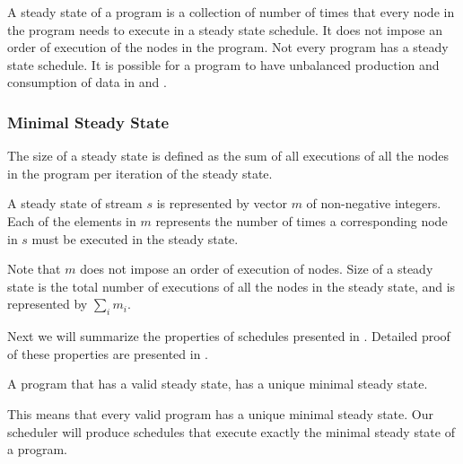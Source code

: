 A steady state of a program is a collection of number of times
that every node in the program needs to execute in a steady state
schedule.  It does not impose an order of execution of the nodes
in the program. Not every {\StreamIt} program has a steady state
schedule.  It is possible for a program to have unbalanced
production and consumption of data in {\splitjoins} and
{\feedbackloops}.
\begin{comment}
The amount of data buffered
continually increases, and cannot be reduced, thus making it
impossible to create a steady state schedule for them.  It is also
possible that a {\feedbackloop} does not have enough data buffered
up internally in order to complete execution of a full steady
state, and thus deadlocks. Programs without a valid steady state
schedule are not considered valid {\StreamIt} programs. In other
words, all valid {\StreamIt} programs have a steady state
schedule.
\end{comment}

\subsubsection{Minimal Steady State}

The size of a steady state is defined as the sum of all executions
of all the nodes in the program per iteration of the steady state.

\begin{definition}
A steady state of stream $s$ is represented by vector $m$ of
non-negative integers. Each of the elements in $m$ represents the
number of times a corresponding node in $s$ must be executed in
the steady state.
\end{definition}

Note that $m$ does not impose an order of execution of nodes. Size
of a steady state is the total number of executions of all the
nodes in the steady state, and is represented by $\sum_i m_i$.

Next we will summarize the properties of schedules presented in
\cite{lee87static}. Detailed proof of these properties are
presented in \cite{karczma-thesis}.

\begin{theorem}
A {\StreamIt} program that has a valid steady state, has a unique
minimal steady state.
\end{theorem}

This means that every valid \StreamIt program has a unique minimal
steady state. Our scheduler will produce schedules that execute
exactly the minimal steady state of a program.

